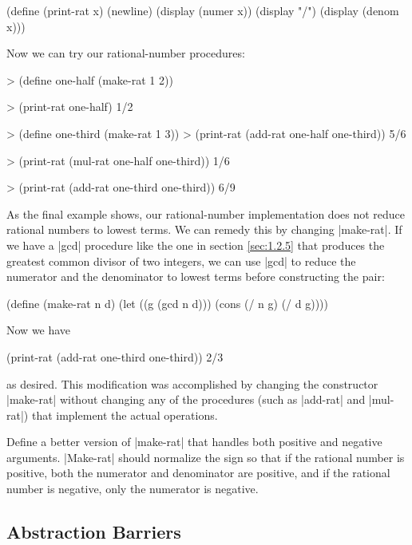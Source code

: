 \begin{schemedisplay}
(define (print-rat x)
  (newline)
  (display (numer x))
  (display "/")
  (display (denom x)))
\end{schemedisplay}
Now we can try our rational-number procedures:

\begin{schemedisplay}
> (define one-half (make-rat 1 2))

> (print-rat one-half)
1/2

> (define one-third (make-rat 1 3))
> (print-rat (add-rat one-half one-third))
5/6

> (print-rat (mul-rat one-half one-third))
1/6

> (print-rat (add-rat one-third one-third))
6/9
\end{schemedisplay}

As the final example shows, our rational-number implementation does
not reduce rational numbers to lowest terms.  We can remedy this by
changing \scheme|make-rat|. If we have a \scheme|gcd| procedure like the one
in section \ref{sec:1.2.5} that produces the greatest common divisor of two
integers, we can use \scheme|gcd| to reduce the numerator and the
denominator to lowest terms before constructing the pair:

\begin{schemedisplay}
(define (make-rat n d)
  (let ((g (gcd n d)))
    (cons (/ n g) (/ d g))))
\end{schemedisplay}
Now we have

\begin{schemedisplay}
(print-rat (add-rat one-third one-third))
2/3
\end{schemedisplay}
as desired.  This modification was accomplished by changing the
constructor \scheme|make-rat| without changing any of the procedures
(such as \scheme|add-rat| and \scheme|mul-rat|)
that implement the actual operations.

\begin{Exercise}
\label{exc:2.1}
Define a better version of \scheme|make-rat| that
handles both positive and negative arguments.  \scheme|Make-rat| should
normalize the sign so that if the rational number is positive, both
the numerator and denominator are positive, and if the rational number
is negative, only the numerator is negative.
\end{Exercise}


\subsection{Abstraction Barriers}
\label{sec:2.1.2}

